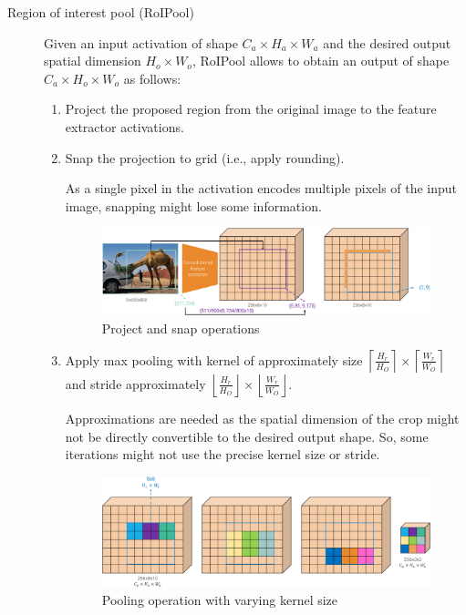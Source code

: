 \begin{description}
        \begin{description}
            \item[Region of interest pool (RoIPool)] 
                Given an input activation of shape $C_a \times H_a \times W_a$ and the desired output spatial dimension $H_o \times W_o$, RoIPool allows to obtain an output of shape $C_a \times H_o \times W_o$ as follows:
                \begin{enumerate}
                    \item Project the proposed region from the original image to the feature extractor activations.
                    \item Snap the projection to grid (i.e., apply rounding).
                        \begin{remark}
                            As a single pixel in the activation encodes multiple pixels of the input image, snapping might lose some information.
                        \end{remark}
                        \begin{figure}[H]
                            \raggedleft
                            \includegraphics[width=0.8\linewidth]{./img/_roipool_snap.pdf}
                            \caption{Project and snap operations}
                        \end{figure}
                    \item Apply max pooling with kernel of approximately size $\left\lceil \frac{H_r}{H_O} \right\rceil \times \left\lceil \frac{W_r}{W_O} \right\rceil$ and stride approximately $\left\lfloor \frac{H_r}{H_O} \right\rfloor \times \left\lfloor \frac{W_r}{W_O} \right\rfloor$.
                        \begin{remark}
                            Approximations are needed as the spatial dimension of the crop might not be directly convertible to the desired output shape. So, some iterations might not use the precise kernel size or stride.
                        \end{remark}
                        \begin{figure}[H]
                            \raggedleft
                            \includegraphics[width=0.75\linewidth]{./img/_roipool_maxpool.pdf}
                            \caption{Pooling operation with varying kernel size}
                        \end{figure}
                \end{enumerate}


\end{description}
\end{description}
